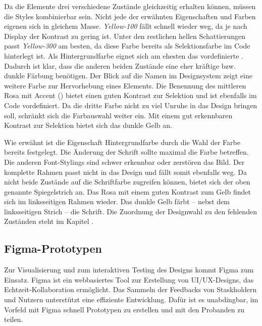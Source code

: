 Da die Elemente drei verschiedene Zustände gleichzeitig erhalten können, müssen die Styles kombinierbar sein. 
Nicht jede der erwähnten Eigenschaften und Farben eigenen sich in gleichem Masse. 
\emph{Yellow-100} fällt schnell wieder weg, da je nach Display der Kontrast zu gering ist. 
Unter den restlichen hellen Schattierungen passt \emph{Yellow-300} am besten, da diese Farbe bereits als Selektionsfarbe im Code hinterlegt ist. 
Als Hintergrundfarbe eignet sich am ehesten das vordefinierte . 
Dadurch ist klar, dass die anderen beiden Zustände eine eher kräftige bzw. dunkle Färbung benötigen. 
Der Blick auf die Namen im Designsystem zeigt eine weitere Farbe zur Hervorhebung eines Elements. 
Die Benennung des mittleren Rosa mit Accent () bietet einen guten Kontrast zur Selektion und ist ebenfalls im Code vordefiniert. 
Da die dritte Farbe nicht zu viel Unruhe in das Design bringen soll, schränkt sich die Farbauswahl weiter ein. 
Mit einem gut erkennbaren Kontrast zur Selektion bietet sich das dunkle Gelb  an. 

Wie erwähnt ist die Eigenschaft Hintergrundfarbe durch die Wahl der Farbe bereits festgelegt. 
Die Änderung der Schrift sollte maximal die Farbe betreffen. 
Die anderen Font-Stylings sind schwer erkennbar oder zerstören das Bild. 
Der komplette Rahmen passt nicht in das Design und fällt somit ebenfalls weg. 
Da nicht beide Zustände auf die Schriftfarbe zugreifen können, bietet sich der oben genannte Spiegelstrich an. 
Das Rosa mit einem guten Kontrast zum Gelb findet sich im linksseitigen Rahmen wieder. 
Das dunkle Gelb färbt – nebst dem linksseitigen Strich – die Schrift. 
Die Zuordnung der Designwahl zu den fehlenden Zuständen steht im Kapitel \textbf{}. 


\clearpage
\subsection{Figma-Prototypen}
\label{sec:figmaPrototype}

Zur Visualisierung und zum interaktiven Testing des Designs kommt Figma zum Einsatz. 
Figma ist ein webbasiertes Tool zur Erstellung von UI/UX-Designs, das Echtzeit-Kollaboration ermöglicht. 
Das Sammeln der Feedbacks von Staskholdern und Nutzern unterstützt eine effiziente Entwicklung. 
Dafür ist es unabdingbar, im Vorfeld mit Figma schnell Prototypen zu erstellen und mit den Probanden zu teilen. 

